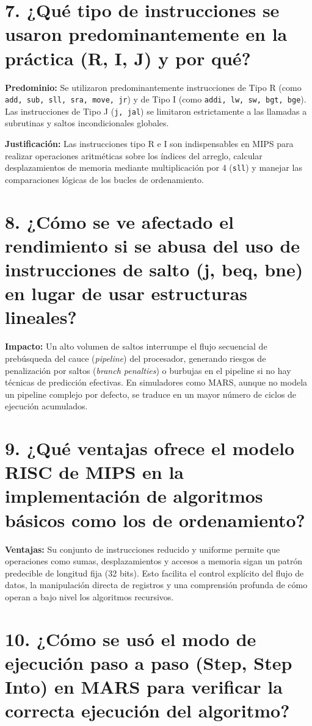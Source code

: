 \documentclass[12pt,a4paper]{article}
\begin{document}
\section*{7. ¿Qué tipo de instrucciones se usaron predominantemente en la práctica (R, I, J) y por qué?}

\textbf{Predominio:} Se utilizaron predominantemente instrucciones de Tipo R (como \texttt{add, sub, sll, sra, move, jr}) y de Tipo I (como \texttt{addi, lw, sw, bgt, bge}). Las instrucciones de Tipo J (\texttt{j, jal}) se limitaron estrictamente a las llamadas a subrutinas y saltos incondicionales globales.

\textbf{Justificación:} Las instrucciones tipo R e I son indispensables en MIPS para realizar operaciones aritméticas sobre los índices del arreglo, calcular desplazamientos de memoria mediante multiplicación por 4 (\texttt{sll}) y manejar las comparaciones lógicas de los bucles de ordenamiento.

\section*{8. ¿Cómo se ve afectado el rendimiento si se abusa del uso de instrucciones de salto (j, beq, bne) en lugar de usar estructuras lineales?}

\textbf{Impacto:} Un alto volumen de saltos interrumpe el flujo secuencial de prebúsqueda del cauce (\textit{pipeline}) del procesador, generando riesgos de penalización por saltos (\textit{branch penalties}) o burbujas en el pipeline si no hay técnicas de predicción efectivas. En simuladores como MARS, aunque no modela un pipeline complejo por defecto, se traduce en un mayor número de ciclos de ejecución acumulados.

\section*{9. ¿Qué ventajas ofrece el modelo RISC de MIPS en la implementación de algoritmos básicos como los de ordenamiento?}

\textbf{Ventajas:} Su conjunto de instrucciones reducido y uniforme permite que operaciones como sumas, desplazamientos y accesos a memoria sigan un patrón predecible de longitud fija (32 bits). Esto facilita el control explícito del flujo de datos, la manipulación directa de registros y una comprensión profunda de cómo operan a bajo nivel los algoritmos recursivos.

\section*{10. ¿Cómo se usó el modo de ejecución paso a paso (Step, Step Into) en MARS para verificar la correcta ejecución del algoritmo?}
\end{document}
